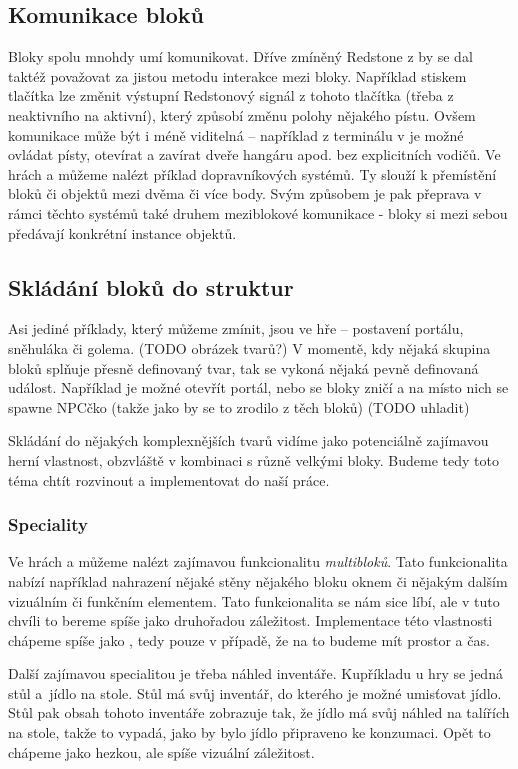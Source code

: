 \subsection{Komunikace bloků}
Bloky spolu mnohdy umí komunikovat. Dříve zmíněný Redstone z  by se dal taktéž považovat za jistou metodu interakce mezi bloky. Například stiskem tlačítka lze změnit výstupní Redstonový signál z tohoto tlačítka (třeba z neaktivního na aktivní), který způsobí změnu polohy nějakého pístu. Ovšem komunikace může být i méně viditelná -- například z terminálu v \SE{} je možné ovládat písty, otevírat a zavírat dveře hangáru apod. bez explicitních vodičů. Ve hrách \MC{} a \SE{} můžeme nalézt příklad dopravníkových systémů. Ty slouží k přemístění bloků či objektů mezi dvěma či více body. Svým způsobem je pak přeprava v rámci těchto systémů také druhem meziblokové komunikace - bloky si mezi sebou předávají konkrétní instance objektů.

\subsection{Skládání bloků do struktur}
Asi jediné příklady, který můžeme zmínit, jsou ve hře \MC{} -- postavení portálu, sněhuláka či golema. (TODO obrázek tvarů?) V momentě, kdy nějaká skupina bloků splňuje přesně definovaný tvar, tak se vykoná nějaká pevně definovaná událost. Například je možné otevřít portál, nebo se bloky zničí a na místo nich se spawne NPCčko (takže jako by se to zrodilo z těch bloků) (TODO uhladit)

Skládání do nějakých komplexnějších tvarů vidíme jako potenciálně zajímavou herní vlastnost, obzvláště v kombinaci s různě velkými bloky. Budeme tedy toto téma chtít rozvinout a implementovat do naší práce. 

\subsubsection{Speciality}
Ve hrách \ME{} a  \NMS{} můžeme nalézt zajímavou funkcionalitu \textit{multibloků}. Tato funkcionalita nabízí například nahrazení nějaké stěny nějakého bloku oknem či nějakým dalším vizuálním či funkčním elementem. Tato funkcionalita se nám sice líbí, ale v tuto chvíli to bereme spíše jako druhořadou záležitost. Implementace této vlastnosti chápeme spíše jako , tedy pouze v případě, že na to budeme mít prostor a čas.

Další zajímavou specialitou je třeba náhled inventáře. Kupříkladu u hry \ME{} se jedná stůl a~jídlo na stole. Stůl má svůj inventář, do kterého je možné umisťovat jídlo. Stůl pak obsah tohoto inventáře zobrazuje tak, že jídlo má svůj náhled na talířích na stole, takže to vypadá, jako by bylo jídlo připraveno ke konzumaci. Opět to chápeme jako hezkou, ale spíše vizuální záležitost.

